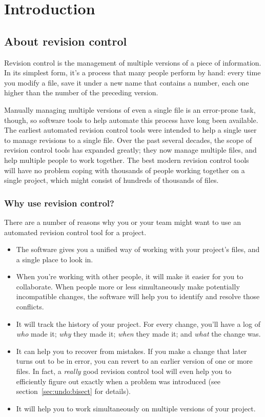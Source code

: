 \chapter{Introduction}
\label{chap:intro}

\section{About revision control}

Revision control is the management of multiple versions of a piece of
information.  In its simplest form, it's a process that many people
perform by hand: every time you modify a file, save it under a new
name that contains a number, each one higher than the number of the
preceding version.

Manually managing multiple versions of even a single file is an
error-prone task, though, so software tools to help automate this
process have long been available.  The earliest automated revision
control tools were intended to help a single user to manage revisions
to a single file.  Over the past several decades, the scope of
revision control tools has expanded greatly; they now manage multiple
files, and help multiple people to work together.  The best modern
revision control tools will have no problem coping with thousands of
people working together on a single project, which might consist of
hundreds of thousands of files.

\subsection{Why use revision control?}

There are a number of reasons why you or your team might want to use
an automated revision control tool for a project.
\begin{itemize}
\item The software gives you a unified way of working with your
  project's files, and a single place to look in.
\item When you're working with other people, it will make it easier
  for you to collaborate.  When people more or less simultaneously
  make potentially incompatible changes, the software will help you to
  identify and resolve those conflicts.
\item It will track the history of your project.  For every change,
  you'll have a log of \emph{who} made it; \emph{why} they made it;
  \emph{when} they made it; and \emph{what} the change was.
\item It can help you to recover from mistakes.  If you make a change
  that later turns out to be in error, you can revert to an earlier
  version of one or more files.  In fact, a \emph{really} good
  revision control tool will even help you to efficiently figure out
  exactly when a problem was introduced (see
  section~\ref{sec:undo:bisect} for details).
\item It will help you to work simultaneously on multiple versions of
  your project.
\end{itemize}


